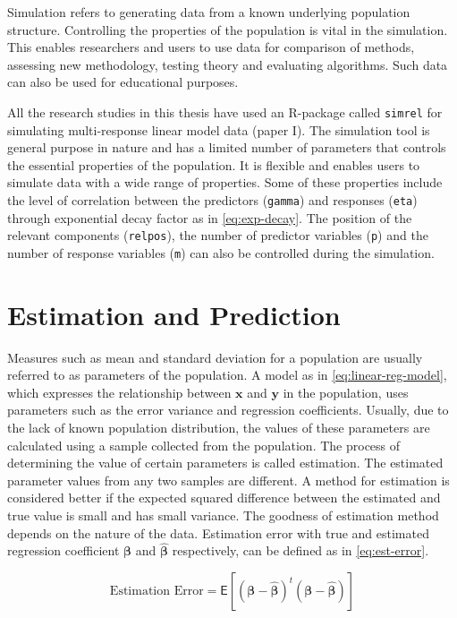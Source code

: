 \documentclass[11pt,twoside,openright,titlepage,
  headinclude,footinclude,BCOR=5mm,
  numbers=noenddot,cleardoublepage=empty,
  tablecaptionabove, dottedtoc,
  bibliography=totoc,paper=a4]{scrreprt}
\begin{document}
Simulation refers to generating data from a known underlying population structure. Controlling the properties of the population is vital in the simulation. This enables researchers and users to use data for comparison of methods, assessing new methodology, testing theory and evaluating algorithms. Such data can also be used for educational purposes.

All the research studies in this thesis have used an R-package called \texttt{simrel} for simulating multi-response linear model data (paper I). The simulation tool is general purpose in nature and has a limited number of parameters that controls the essential properties of the population. It is flexible and enables users to simulate data with a wide range of properties. Some of these properties include the level of correlation between the predictors (\texttt{gamma}) and responses (\texttt{eta}) through exponential decay factor as in \eqref{eq:exp-decay}. The position of the relevant components (\texttt{relpos}), the number of predictor variables (\texttt{p}) and the number of response variables (\texttt{m}) can also be controlled during the simulation.

\hypertarget{estimation-and-prediction}{%
\section{Estimation and Prediction}\label{estimation-and-prediction}}

Measures such as mean and standard deviation for a population are usually referred to as parameters of the population. A model as in \eqref{eq:linear-reg-model}, which expresses the relationship between \(\mathbf{x}\) and \(\mathbf{y}\) in the population, uses parameters such as the error variance and regression coefficients. Usually, due to the lack of known population distribution, the values of these parameters are calculated using a sample collected from the population. The process of determining the value of certain parameters is called estimation. The estimated parameter values from any two samples are different. A method for estimation is considered better if the expected squared difference between the estimated and true value is small and has small variance. The goodness of estimation method depends on the nature of the data. Estimation error with true and estimated regression coefficient \(\boldsymbol{\beta}\) and \(\boldsymbol{\widehat{\beta}}\) respectively, can be defined as in \eqref{eq:est-error}.

\begin{equation}
\text{Estimation Error} = \mathsf{E}\left[
  \left(\boldsymbol{\beta} - \hat{\boldsymbol{\beta}}\right)^t 
  \left(\boldsymbol{\beta} - \hat{\boldsymbol{\beta}}\right)
\right]
\label{eq:est-error}
\end{equation}
\end{document}
